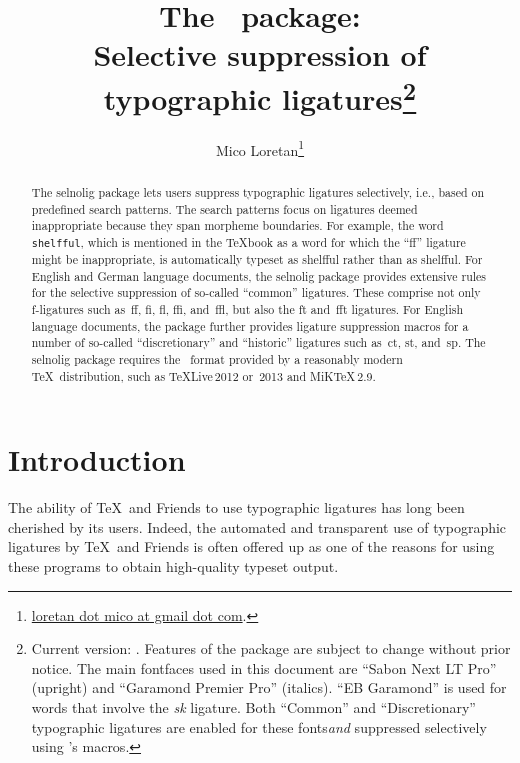 \documentclass[11pt]{article}
\title{The \selnoligpackagename\ package: \\
Selective suppression of typographic ligatures\thanks{
Current version: \selnoligpackageversion. Features of the \pkg{selnolig} package are subject to change without prior notice. 
\newline\hspace*{\parindent}
The main fontfaces used in this document are \enquote{Sabon Next LT Pro} (upright) and \enquote{Garamond Premier Pro} (italics). \enquote{EB Garamond} is used for words that involve the \emph{\mbox{\ebg sk}} ligature. Both \enquote{Common} and \enquote{Discretionary} typographic ligatures are enabled for these fonts\textemdash \emph{and} suppressed selectively using \pkg{selnolig}'s macros.}}
\author{Mico Loretan\thanks{
\href{mailto:loretan.mico@gmail.com}{loretan dot mico at gmail dot com}.}}
\date{\selnoligpackagedate}
\newcommand{\pkg}[1]{\textsf{#1}}
\newcommand{\opt}[1]{\texttt{#1}}
\begin{document}
\VerbatimFootnotes
{}
\maketitle


\begin{abstract}

The \pkg{selnolig} package lets users suppress typographic ligatures selectively, i.e., based on predefined search patterns. The search patterns focus on ligatures deemed inappropriate because they span morpheme boundaries. For example, the word \opt{shelfful}, which is mentioned in the \TeX book as a word for which the \enquote{ff} ligature might be inappropriate, is automatically typeset as shelfful rather than as shel\mbox{ff}ul.
\newline\hspace*{\parindent}
For English and German language documents, the \pkg{selnolig} package provides extensive rules for the selective suppression of so-called \enquote{common} ligatures. These comprise not only f-ligatures such as~ff, fi, fl, ffi, and~ffl, but also the ft and~fft ligatures.
\newline\hspace*{\parindent}
For English language documents, the package further provides ligature suppression macros for a number of so-called \enquote{discretionary} and \enquote{historic} ligatures such as~ct, st, and~sp.
\newline\hspace*{\parindent}
The \pkg{selnolig} package requires the \LuaLaTeX\ format provided by a reasonably modern \TeX\ distribution, such as \TeX Live\,2012 or~2013 and MiK\TeX\,2.9.
\end{abstract}


\tableofcontents

\clearpage
{}
\section{Introduction}

The ability of \TeX\ and Friends to use typographic ligatures has long been cherished by its users. Indeed, the automated and transparent use of typographic ligatures by \TeX\ and Friends is often offered up as one of the reasons for using these programs to obtain high-quality typeset output.
\end{document}
